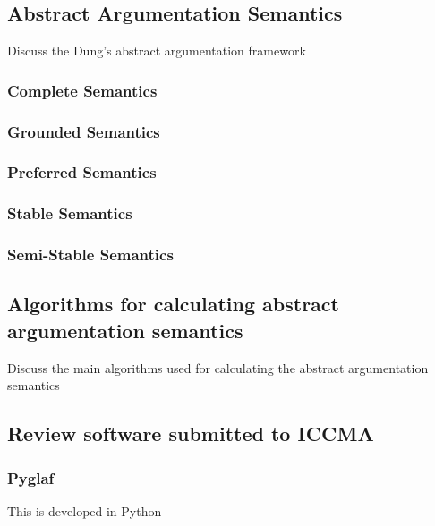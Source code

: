 \subsection{Abstract Argumentation Semantics}
Discuss the Dung's abstract argumentation framework 

\subsubsection{Complete Semantics}

\subsubsection{Grounded Semantics}

\subsubsection{Preferred Semantics}

\subsubsection{Stable Semantics}

\subsubsection{Semi-Stable Semantics}

\subsection{Algorithms for calculating abstract argumentation semantics}
Discuss the main algorithms used for calculating the abstract argumentation semantics


\subsection{Review software submitted to ICCMA}
\subsubsection{Pyglaf}

This is developed in Python